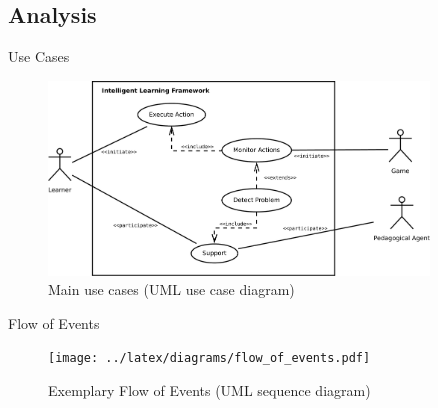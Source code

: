 \documentclass[compress]{beamer}
\begin{document}

\subsection{Analysis}

\begin{frame}{Use Cases}
\begin{figure}[t]
    \centering
    \includegraphics[width=0.9\textwidth]{diagrams/simple_use_case.pdf}
    \caption[Main use cases (UML use case diagram)]
    {Main use cases (UML use case diagram)}
\end{figure}
\end{frame}

\begin{frame}{Flow of Events}
\begin{figure}
    \centering
    \texttt{[image: ../latex/diagrams/flow\_of\_events.pdf]}
    \caption[Exemplary Flow of Events (UML sequence diagram)]
    {Exemplary Flow of Events (UML sequence diagram)}
\end{figure}
\end{frame}
\end{document}
